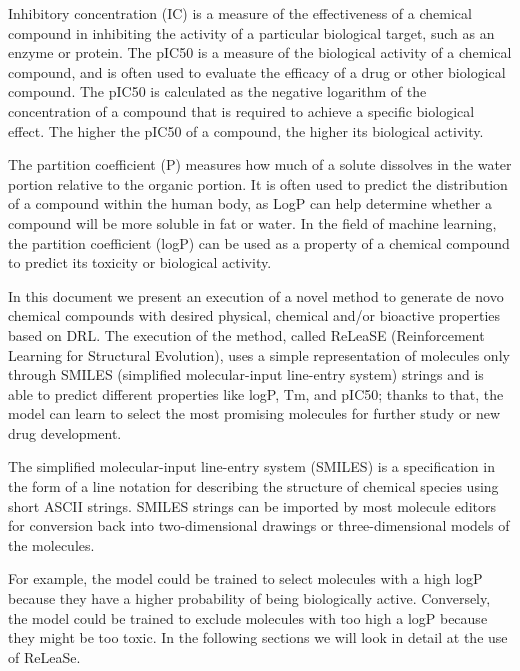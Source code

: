 \documentclass[a4paper]{article}
\begin{document}
Inhibitory concentration (IC) is a measure of the effectiveness of a chemical compound in inhibiting the activity of a particular biological target, such as an enzyme or protein. The pIC50 is a measure of the biological activity of a chemical compound, and is often used to evaluate the efficacy of a drug or other biological compound. The pIC50 is calculated as the negative logarithm of the concentration of a compound that is required to achieve a specific biological effect. The higher the pIC50 of a compound, the higher its biological activity.


The partition coefficient (P) measures how much of a solute dissolves in the water portion relative to the organic portion. It is often used to predict the distribution of a compound within the human body, as LogP can help determine whether a compound will be more soluble in fat or water. In the field of machine learning, the partition coefficient (logP) can be used as a property of a chemical compound to predict its toxicity or biological activity.


In this document we present an execution of a novel method to generate de novo chemical compounds with desired physical, chemical and/or bioactive properties based on DRL. The execution of the method, called ReLeaSE (Reinforcement Learning for Structural Evolution), uses a simple representation of molecules only through SMILES (simplified molecular-input line-entry system) strings and is able to predict different properties like logP, Tm, and pIC50; thanks to that, the model can learn to select the most promising molecules for further study or new drug development. 


The simplified molecular-input line-entry system (SMILES) is a specification in the form of a line notation for describing the structure of chemical species using short ASCII strings. SMILES strings can be imported by most molecule editors for conversion back into two-dimensional drawings or three-dimensional models of the molecules.


For example, the model could be trained to select molecules with a high logP because they have a higher probability of being biologically active. Conversely, the model could be trained to exclude molecules with too high a logP because they might be too toxic.
In the following sections we will look in detail at the use of ReLeaSe.
\end{document}
